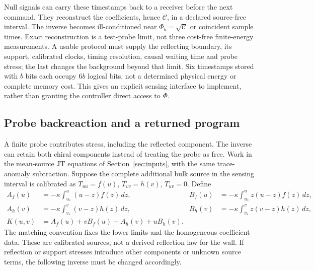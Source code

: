 Null signals can carry these timestamps back to a receiver before the next
command. They reconstruct the coefficients, hence $\mathcal C$, in a declared
source-free interval. The inverse becomes ill-conditioned near
$\Phi_b=\sqrt{\mathcal C}$ or coincident sample times. Exact reconstruction is
a test-probe limit, not three cost-free finite-energy measurements. A usable
protocol must supply the reflecting boundary, its support, calibrated clocks,
timing resolution, causal waiting time and probe stress; the last changes the
background beyond that limit. Six timestamps stored with $b$ bits each occupy
$6b$ logical bits, not a determined physical energy or complete memory cost.
This gives an explicit sensing interface to implement, rather than granting the
controller direct access to $\Phi$.

\subsection{Probe backreaction and a returned program}
\label{sec:returned-program}

A finite probe contributes stress, including the reflected component. The inverse
can retain both chiral components instead of treating the probe as free. Work in
the mean-source JT equations of Section~\ref{sec:inputs}, with the same trace-anomaly
subtraction. Suppose the complete additional bulk source in the sensing interval
is calibrated as $T_{uu}=f(u)$, $T_{vv}=h(v)$, $T_{uv}=0$. Define
\begin{align}
 A_f(u)&=-\kappa\int_{u_*}^{u}(u-z)f(z)\,dz,&
 B_f(u)&=-\kappa\int_{u_*}^{u}z(u-z)f(z)\,dz,\nonumber\\
 A_h(v)&=-\kappa\int_{v_*}^{v}(v-z)h(z)\,dz,&
 B_h(v)&=-\kappa\int_{v_*}^{v}z(v-z)h(z)\,dz,\nonumber\\
 K(u,v)&=A_f(u)+vB_f(u)+A_h(v)+uB_h(v).
 \label{eq:two-chiral-K}
\end{align}
The matching convention fixes the lower limits and the homogeneous coefficient
data. These are calibrated sources, not a derived reflection law for the wall.
If reflection or support stresses introduce other components or unknown source
terms, the following inverse must be changed accordingly.


